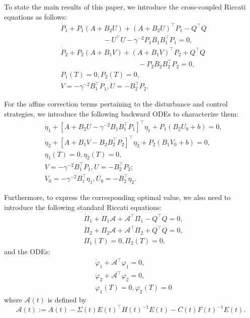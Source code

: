 \documentclass[lettersize,journal]{IEEEtran}
\theoremstyle{plain}
\theoremstyle{definition}
\begin{document}
To state the main results of this paper, we introduce the cross-coupled Riccati equations as follows:
\begin{align}
	&\dot{P}_1 + P_1(A + B_2U) + (A + B_2U)^{\top}P_1 - Q^{\top}Q \nonumber\\
	&\qquad \qquad \qquad - U^{\top}U - \gamma^{-2}P_1 B_1 B_1^{\top} P_1 = 0, \label{eq:5.1}\\
	&\dot{P}_2 + P_2(A + B_1V) + (A + B_1V)^{\top}P_2 + Q^{\top}Q \nonumber\\
	&\qquad\qquad\qquad\qquad\qquad\quad - P_2 B_2 B_2^{\top} P_2 = 0, \label{eq:5.2}\\
	&P_1(T) = 0, P_2(T) = 0, \nonumber\\
	&V = -\gamma^{-2}B_1^{\top}P_1, U = -B_2^{\top}P_2. \nonumber
\end{align}

For the affine correction terms pertaining to the disturbance and control strategies, we introduce the following backward ODEs to characterize them:
\begin{align}
	&\dot{\eta}_1 + [A + B_2U - \gamma^{-2}B_1B_1^{\top}P_1]^{\top}\eta_1 + P_1(B_2U_0 + b) = 0, \label{eq:5.3}\\
	&\dot{\eta}_2 + [A + B_1V - B_2B_2^{\top}P_2]^{\top}\eta_2 + P_2(B_1V_0 + b) = 0, \label{eq:5.4}\\
	&\eta_1(T) = 0, \eta_2(T) = 0, \nonumber\\
	&V = -\gamma^{-2}B_1^{\top}P_1, U = -B_2^{\top}P_2;\nonumber\\
	&V_0 = -\gamma^{-2}B_1^{\top}\eta_1, U_0 = -B_2^{\top}\eta_2. \label{eq:5.5}
\end{align}

Furthermore, to express the corresponding optimal value, we also need to introduce the following standard Riccati equations:
\begin{align}
	&\dot{\Pi}_1 + \Pi_1\mathcal{A} + \mathcal{A}^{\top}\Pi_1 - Q^{\top}Q = 0, \label{eq:5.6}\\
	&\dot{\Pi}_2 + \Pi_2\mathcal{A} + \mathcal{A}^{\top}\Pi_2 + Q^{\top}Q = 0, \label{eq:5.7}\\
	&\Pi_1(T) = 0, \Pi_2(T) = 0, \nonumber
\end{align}
and the ODEs:
\begin{align}
	&\dot{\varphi}_1 + \mathcal{A}^{\top}\varphi_1 = 0, \label{eq:5.8}\\
	&\dot{\varphi}_2 + \mathcal{A}^{\top}\varphi_2 = 0, \label{eq:5.9}\\
	&\varphi_1(T) = 0, \varphi_2(T) = 0 \nonumber
\end{align}
where $\mathcal{A}(t)$ is defined by \[\mathcal{A}(t) := A(t) - \Sigma(t)E(t)^{\top}H(t)^{-1}E(t) - C(t)F(t)^{-1}E(t).\]
\end{document}
